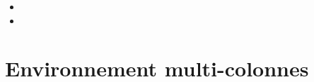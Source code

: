 \documentclass[french,11pt,a4paper]{article}
\begin{document}
\begin{DemoCode}{}
\lipsum[1][1-3]

\begin{center}
    \lipsum[1][1]
\end{center}

\lipsum[1][1-2]
\end{DemoCode}

\begin{DemoCode}{}
\lipsum[1][1-3]\par

{\centering\lipsum[1][1]\par}

\lipsum[1][1-2]
\end{DemoCode}

\begin{DemoCode}{}
\lipsum[1][1-3]

\begin{Centrage}
    \lipsum[1][1]
\end{Centrage}

\lipsum[1][1-2]
\end{DemoCode}

\begin{DemoCode}{}
\lipsum[1][1-3]

\begin{Centrage}[Avant=0pt,Apres=0pt]
    \lipsum[1][1]
\end{Centrage}

\lipsum[1][1-2]
\end{DemoCode}

\begin{DemoCode}{}
\lipsum[2][3]

\begin{itemize}
    \item \lipsum[1][1]
    \item \lipsum[1][2]
\end{itemize}

\begin{Centrage}[Avant=-0.25\baselineskip]
    \lipsum[1][1]
\end{Centrage}

\lipsum[1][1-2]
\end{DemoCode}

\pagebreak

\section{Environnement multi-colonnes}
\end{document}
